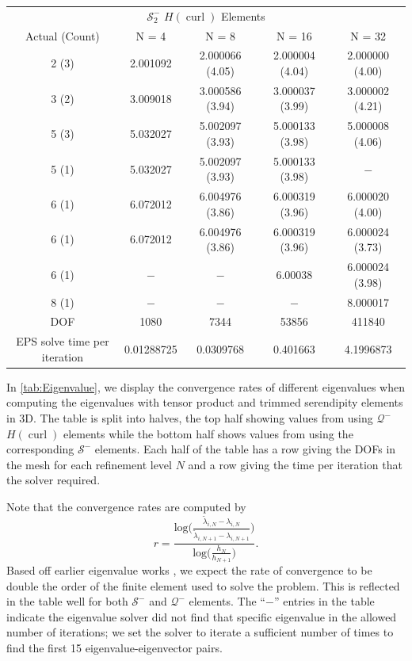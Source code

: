 \documentclass[format=acmsmall,screen,timestamp=false,a4paper]{acmart}
\DeclareMathOperator{\curl}{curl}
\newcommand{\hcurl}{\ensuremath{{H}(\curl)}\xspace}
\begin{document}
\begin{table}[htbp]
\begin{tabular}{ c c c c c }
  \toprule
\multicolumn{5}{c}{$\mathcal{S}^-_2$ \hcurl Elements} \\[0.3em]
Actual (Count) & N = 4 & N = 8 & N = 16 & N = 32 \\ 
\midrule
2 (3) & 2.001092 & 2.000066 (4.05) & 2.000004 (4.04) & 2.000000 (4.00) \\  
3 (2) & 3.009018 & 3.000586 (3.94) & 3.000037 (3.99) & 3.000002 (4.21) \\
5 (3) & 5.032027 & 5.002097 (3.93)& 5.000133 (3.98) & 5.000008 (4.06) \\
5 (1) & 5.032027 & 5.002097 (3.93) & 5.000133 (3.98) & $-$ \\
6 (1) & 6.072012 & 6.004976 (3.86) & 6.000319 (3.96) & 6.000020 (4.00) \\
6 (1) & 6.072012 & 6.004976 (3.86) & 6.000319 (3.96) & 6.000024 (3.73)\\
6 (1) & $-$ & $-$ & 6.00038 & 6.000024 (3.98)\\
8 (1) & $-$ & $-$ & $-$ & 8.000017 \\
\midrule
DOF  & 1080 & 7344 & 53856 & 411840 \\
\midrule
EPS solve time per iteration & 0.01288725 & 0.0309768 & 0.401663 & 4.1996873 \\
\bottomrule
\end{tabular}
\end{table}
In \cref{tab:Eigenvalue}, we display the convergence rates of different eigenvalues when computing the eigenvalues with tensor product and trimmed serendipity elements in 3D.  The table is split into halves, the top half showing values from using $\mathcal{Q}^-$ \hcurl elements while the bottom half shows values from using the corresponding $\mathcal{S}^-$ elements.  Each half of the table has a row giving the DOFs in the mesh for each refinement level $N$ and a row giving the time per iteration that the solver required.  

Note that the convergence rates are computed by
\[r = \frac{\text{log}\bigg(\frac{\tilde{\lambda}_{i,N} - \lambda_{i,N}}{\tilde{\lambda}_{i,N+1} - \lambda_{i,N+1}} \bigg)}{\text{log}\bigg( \frac{h_N}{h_{N+1}} \bigg)}. \]
Based off earlier eigenvalue works \cite{boffi2010finite}, we expect the rate of convergence to be double the order of the finite element used to solve the problem.  This is reflected in the table well for both $\mathcal{S}^-$ and $\mathcal{Q}^-$ elements.  The ``$-$'' entries in the table indicate the eigenvalue solver did not find that specific eigenvalue in the allowed number of iterations; we set the solver to iterate a sufficient number of times to find the first 15 eigenvalue-eigenvector pairs.
\end{document}
